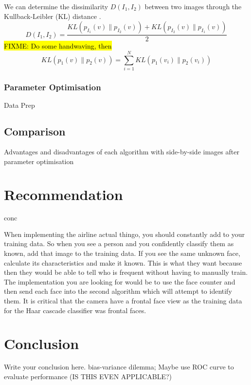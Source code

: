 \documentclass{article}
\begin{document}
We can determine the dissimilarity $D(I_1, I_2)$ between two images through the Kullback-Leibler (KL) distance \cite{kullback1951information}.
\begin{equation}
	D(I_1, I_2) = \frac{KL\left(p_{I_1}(v) \| p_{I_2}(v)\right) +
	              KL\left(p_{I_2}(v) \| p_{I_1}(v)\right)}{2}
\end{equation}
\hl{FIXME: Do some handwaving, then}
\begin{equation}
	KL(p_1(v) \| p_2(v)) = \sum_{i=1}^{N}KL(p_1(v_i) \| p_2(v_i))
\end{equation}

\subsubsection{Parameter Optimisation}
Data Prep

\subsection{Comparison}
Advantages and disadvantages of each algorithm with side-by-side images after parameter optimisation


\section{Recommendation}
conc

When implementing the airline actual thingo, you should constantly add to your training data.
So when you see a person and you confidently classify them as known, add that image to the training data.
If you see the same unknown face, calculate its characteristics and make it known. This is what they want because then they would be able to tell who is frequent without having to manually train.
The implementation you are looking for would be to use the face counter and then send each face into the second algorithm which will attempt to identify them.
It is critical that the camera have a frontal face view as the training data for the Haar cascade classifier was frontal faces.


\section{Conclusion}
Write your conclusion here. \citep{guyon1997scaling} \citep{belhumeur1997eigenfaces}
bias-variance dilemma; Maybe use ROC curve to evaluate performance (IS THIS EVEN APPLICABLE?)
\end{document}
